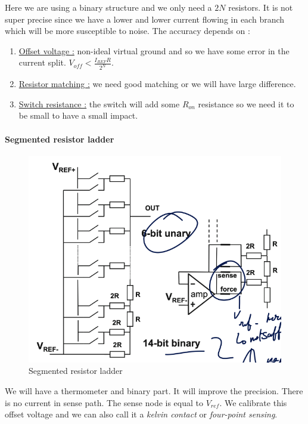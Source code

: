 \documentclass[
  a4paper,
]{article}
\begin{document}
Here we are using a binary structure and we only need a \(2N\)
resistors. It is not super precise since we have a lower and lower
current flowing in each branch which will be more susceptible to noise.
The accuracy depends on :

\begin{enumerate}
\def\labelenumi{\arabic{enumi}.}
\item
  \ul{Offset voltage :} non-ideal virtual ground and so we have some
  error in the current split. \(V_{off} < \frac{I_{REF} R}{2^N}\).
\item
  \ul{Resistor matching :} we need good matching or we will have large
  difference.
\item
  \ul{Switch resistance :} the switch will add some \(R_{on}\)
  resistance so we need it to be small to have a small impact.
\end{enumerate}

\hypertarget{segmented-resistor-ladder}{%
\paragraph{Segmented resistor ladder}\label{segmented-resistor-ladder}}

\begin{figure}
\hypertarget{fig:segmented-resistor-label}{%
\centering
\includegraphics{img/segmented_r_ladder.png}
\caption{Segmented resistor ladder}\label{fig:segmented-resistor-label}
}
\end{figure}

We will have a thermometer and binary part. It will improve the
precision. There is no current in sense path. The sense node is equal to
\(V_{ref}\). We calibrate this offset voltage and we can also call it a
\emph{kelvin contact} or \emph{four-point sensing}.
\end{document}
